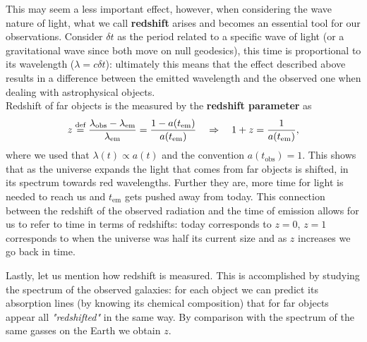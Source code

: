 This may seem a less important effect, however, when considering the wave nature of light, what we call \textbf{redshift} arises and becomes an essential tool for our observations. Consider $\delta t$ as the period related to a specific wave of light (or a gravitational wave since both move on null geodesics), this time is proportional to its wavelength ($\lambda= c\delta t$): ultimately this means that the effect described above results in a difference between the emitted wavelength and the observed one when dealing with astrophysical objects.\\Redshift of far objects is the measured by the \textbf{redshift parameter} as
\begin{equation}
    \label{eq:redshift}
    z\stackrel{\text{def}}{=}\frac{\lambda_{\text{obs}}-\lambda_{\text{em}}}{\lambda_{\text{em}}}=\frac{1-a(t_{\text{em}})}{a(t_\text{em})}\quad\Rightarrow\quad 1+z=\frac{1}{a(t_{\text{em}})},
\end{equation}
where we used that $\lambda(t)\propto a(t)$ and the convention $a(t_\text{obs})=1$. This shows that as the universe expands the light that comes from far objects is shifted, in its spectrum towards red wavelengths. Further they are, more time for light is needed to reach us and $t_\text{em}$ gets pushed away from today. This connection between the redshift of the observed radiation and the time of emission allows for us to refer to time in terms of redshifts: today corresponds to $z=0$, $z=1$ corresponds to when the universe was half its current size and as $z$ increases we go back in time.

Lastly, let us mention how redshift is measured. This is accomplished by studying the spectrum of the observed galaxies: for each object we can predict its absorption lines (by knowing its chemical composition) that for far objects appear all \emph{"redshifted"} in the same way. By comparison with the spectrum of the same gasses on the Earth we obtain $z$. 